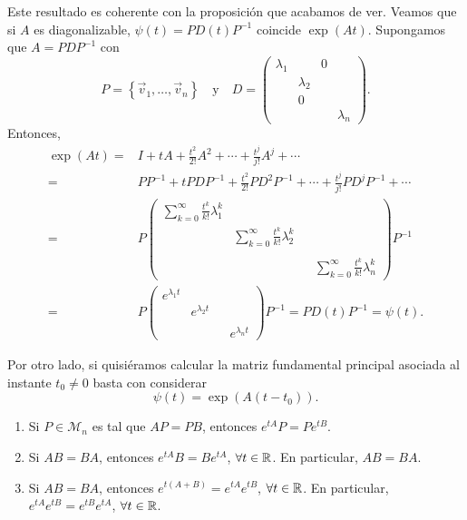 \begin{observation}
Este resultado es coherente con la proposición que acabamos de ver. Veamos que si $\displaystyle A $ es diagonalizable, $\displaystyle \psi\left(t\right)=PD\left(t\right)P^{-1} $ coincide $\displaystyle \exp\left(At\right)$. Supongamos que $\displaystyle A = PDP^{-1} $ con 
	\[P = \left\{ \vec{v}_{1}, \ldots, \vec{v}_{n}\right\} \quad \text{y} \quad D = \begin{pmatrix} \lambda_{1} & &0 & \\
	& \lambda_{2} & & \\
	& 0& & \\
	& & & \lambda_{n}\end{pmatrix} .\]
Entonces, 
\[
\begin{split}
	\exp\left(At\right) = & I + tA + \frac{t ^{2}}{2!}A^{2} + \cdots + \frac{t ^{j}}{j!}A^{j} + \cdots \\
	= &  P P^{-1} + t P D P^{-1} + \frac{t ^{2}}{2!}PD^{2}P^{-1} + \cdots + \frac{t ^{j}}{j!}PD^{j}P^{-1} + \cdots\\
 = & P\begin{pmatrix} \sum^{\infty}_{k = 0}\frac{t ^{k}}{k!}\lambda_{1}^{k} & & & \\
	& \sum^{\infty}_{k = 0}\frac{t ^{k}}{k!}\lambda_{2}^{k} & & \\
	& & & \\
	& & & \sum^{\infty}_{k = 0}\frac{t ^{k}}{k!}\lambda_{n}^{k}\end{pmatrix} P^{-1}\\
	= & P\begin{pmatrix} e^{\lambda_{1}t} & & & \\
	& e^{\lambda_{2}t} & & \\
	& & & \\
	& & & e^{\lambda_{n}t}\end{pmatrix}P^{-1}=PD\left(t\right)P^{-1} = \psi\left(t\right).
\end{split}
\]
\end{observation}
\begin{observation}
Por otro lado, si quisiéramos calcular la matriz fundamental principal asociada al instante $\displaystyle t_{0} \neq 0 $ basta con considerar
\[\psi\left(t\right)=\exp\left(A\left(t-t_{0}\right)\right) .\]
\end{observation}
\begin{prop}
\begin{enumerate}
\item Si $\displaystyle P\in \mathcal{M}_{n} $ es tal que $\displaystyle AP = PB $, entonces $\displaystyle e^{tA}P = Pe^{tB} $.
\item Si $\displaystyle AB = BA $, entonces $\displaystyle e^{tA}B = Be^{tA} $, $\displaystyle \forall t \in \mathbb{R} $. En particular, $\displaystyle AB = BA $. 
\item Si $\displaystyle AB = BA $, entonces $\displaystyle e^{t\left(A + B\right)}=e^{tA}e^{tB} $, $\displaystyle \forall t \in \mathbb{R} $. En particular, $\displaystyle e^{tA}e^{tB}=e^{tB}e^{tA} $, $\displaystyle \forall t \in \mathbb{R} $. 
\end{enumerate} 
\end{prop}
